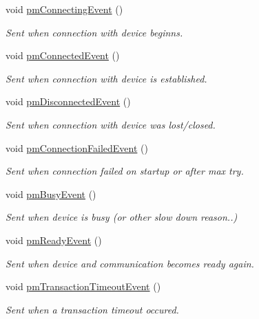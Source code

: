 \begin{DoxyCompactItemize}
void \hyperlink{classmdt_port_manager_a04fb1d09af226677cacd6f0e485d9810}{pmConnectingEvent} ()
\begin{DoxyCompactList}\small\item\em Sent when connection with device beginns. \end{DoxyCompactList}\item 
void \hyperlink{classmdt_port_manager_a871ec7f9676a12c84196404285cf2161}{pmConnectedEvent} ()
\begin{DoxyCompactList}\small\item\em Sent when connection with device is established. \end{DoxyCompactList}\item 
void \hyperlink{classmdt_port_manager_ab4667ac04a31166eeb7b5f92893b16db}{pmDisconnectedEvent} ()
\begin{DoxyCompactList}\small\item\em Sent when connection with device was lost/closed. \end{DoxyCompactList}\item 
void \hyperlink{classmdt_port_manager_a57fc083d7db52279ec6b990b75705552}{pmConnectionFailedEvent} ()
\begin{DoxyCompactList}\small\item\em Sent when connection failed on startup or after max try. \end{DoxyCompactList}\item 
void \hyperlink{classmdt_port_manager_a5959d4025f4903eef0ea65c350f6f9b3}{pmBusyEvent} ()
\begin{DoxyCompactList}\small\item\em Sent when device is busy (or other slow down reason..) \end{DoxyCompactList}\item 
void \hyperlink{classmdt_port_manager_aa23c17048773e345778e7d6393f630db}{pmReadyEvent} ()
\begin{DoxyCompactList}\small\item\em Sent when device and communication becomes ready again. \end{DoxyCompactList}\item 
void \hyperlink{classmdt_port_manager_a0be3429f901fc9bf4adee196035d2cee}{pmTransactionTimeoutEvent} ()
\begin{DoxyCompactList}\small\item\em Sent when a transaction timeout occured. \end{DoxyCompactList}\end{DoxyCompactItemize}
